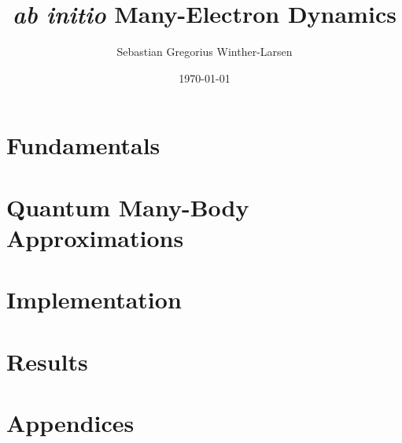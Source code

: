 \documentclass[twoside, english, notitlepage, 10pt]{uiofysmaster}
\author{Sebastian Gregorius Winther-Larsen}
\title{\emph{ab initio} Many-Electron Dynamics}
\date{\today}
\begin{document}
\frontmatter
    \maketitle

    \tableofcontents

\mainmatter

    \part{Fundamentals}

        
        

    \part{Quantum Many-Body Approximations}

        
        
        

    \part{Implementation}

        
         
    
    \part{Results}
        
        
        

    \part{Appendices}
    \appendix

        
        
        
        
        

    \printbibliography
\end{document}
